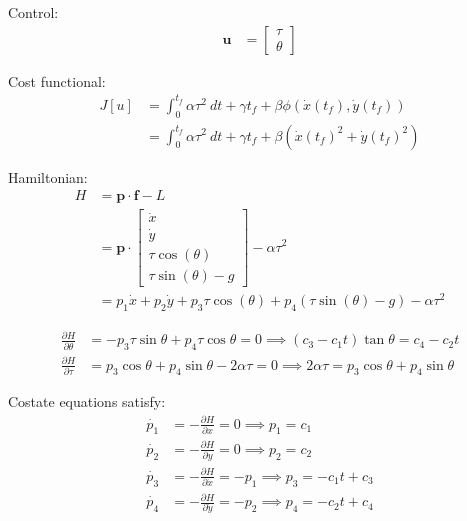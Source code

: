 \documentclass[11pt]{article}
\begin{document}
Control:
\begin{align}
    \mathbf{u} &=
    \begin{bmatrix*}
        \tau \\ \theta
    \end{bmatrix*}
\end{align}

Cost functional:
\begin{align}
    J[u] &= \int_{0}^{t_f} \alpha \tau^2 \ dt + \gamma t_f + \beta \phi(\dot{x}(t_f), \dot{y}(t_f)) \\
    &= \int_{0}^{t_f} \alpha \tau^2\ dt + \gamma t_f + \beta\left(\dot{x}(t_f)^2 + \dot{y}(t_f)^2\right)
\end{align}

Hamiltonian:
\begin{align}
    H &= \mathbf{p} \cdot \mathbf{f} - L \\
    &= \mathbf{p} \cdot
    \begin{bmatrix*}
        \dot{x} \\ \dot{y} \\ \tau \cos(\theta) \\ \tau\sin(\theta) - g
    \end{bmatrix*} - \alpha \tau^2 \\
    &= p_1 \dot{x} + p_2 \dot{y} + p_3 \tau \cos(\theta) + p_4(\tau\sin(\theta) - g) - \alpha \tau^2
\end{align}

\begin{align}
    \frac{\partial H}{\partial \theta } &= -p_3 \tau \sin\theta + p_4 \tau \cos\theta = 0 \implies (c_3 - c_1 t) \tan\theta = c_4 - c_2 t \\
    \frac{\partial H}{\partial \tau } &= p_3 \cos\theta + p_4 \sin\theta - 2\alpha \tau = 0 \implies 2\alpha \tau = p_3 \cos\theta + p_4 \sin\theta
\end{align}

Costate equations satisfy:
\begin{align}
    \dot{p_1} &= -\frac{\partial H}{\partial x} = 0 \implies p_1 = c_1 \\
    \dot{p_2} &= -\frac{\partial H}{\partial y} = 0 \implies p_2 = c_2 \\
    \dot{p_3} &= -\frac{\partial H}{\partial \dot{x}} = -p_1 \implies p_3 = -c_1 t + c_3 \\
    \dot{p_4} &= -\frac{\partial H}{\partial \dot{y}} = -p_2 \implies p_4 = -c_2 t + c_4
\end{align}
\end{document}
